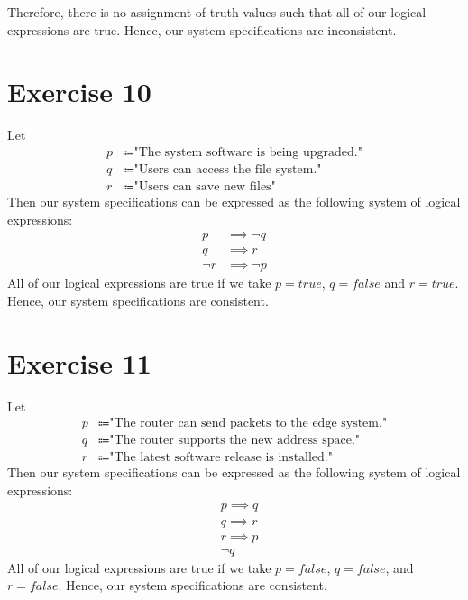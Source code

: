 \documentclass{article}
\begin{document}
Therefore, there is no assignment of truth values such that all of our logical expressions are true. Hence, our system specifications are inconsistent.

\pagebreak

\section{Exercise 10}
Let
\begin{align*}
	p & \Coloneqq \text{"The system software is being upgraded."} \\
	q & \Coloneqq \text{"Users can access the file system."}      \\
	r & \Coloneqq \text{"Users can save new files"}
\end{align*}
Then our system specifications can be expressed as the following system of logical expressions:
\begin{align}
	p      & \implies \neg q \label{ex10eq1} \\
	q      & \implies r \label{ex10eq2}      \\
	\neg r & \implies \neg p \label{ex10eq3}
\end{align}
All of our logical expressions are true if we take $p = true$, $q = false$ and $r = true$. Hence, our system specifications are consistent.

\pagebreak

\section{Exercise 11}
Let
\begin{align*}
	p & \Coloneqq \text{"The router can send packets to the edge system."} \\
	q & \Coloneqq \text{"The router supports the new address space."}      \\
	r & \Coloneqq \text{"The latest software release is installed."}
\end{align*}
Then our system specifications can be expressed as the following system of logical expressions:
\begin{align}
	 & p \implies q \label{ex11eq1} \\
	 & q \implies r \label{ex11eq2} \\
	 & r \implies p \label{ex11eq3} \\
	 & \neg q \label{ex11eq4}
\end{align}
All of our logical expressions are true if we take $p = false$, $q = false$, and $r = false$. Hence, our system specifications are consistent.
\end{document}
